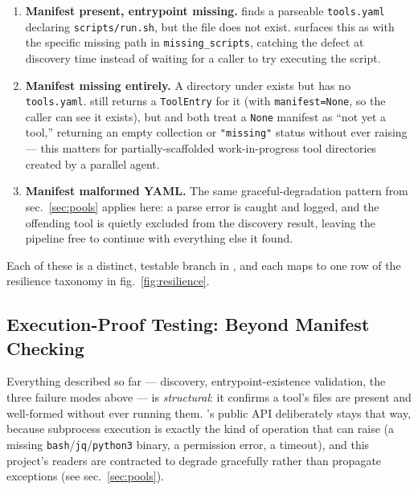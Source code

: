 \documentclass[
]{article}
\providecommand{\tightlist}{%
  \setlength{\itemsep}{0pt}\setlength{\parskip}{0pt}}
\begin{document}
\begin{enumerate}
\def\labelenumi{\arabic{enumi}.}
\tightlist
\item
  \textbf{Manifest present, entrypoint missing.}
   finds a parseable \texttt{tools.yaml}
  declaring \texttt{scripts/run.sh}, but the file does not exist.
   surfaces this as
   with the specific missing path in
  \texttt{missing\_scripts}, catching the defect at discovery time
  instead of waiting for a caller to try executing the script.
\item
  \textbf{Manifest missing entirely.} A directory under
   exists but has no \texttt{tools.yaml}.
   still returns a \texttt{ToolEntry} for it
  (with \texttt{manifest=None}, so the caller can see it exists), but
   and
   both treat a \texttt{None}
  manifest as ``not yet a tool,'' returning an empty collection or
  \texttt{"missing"} status without ever raising --- this matters for
  partially-scaffolded work-in-progress tool directories created by a
  parallel agent.
\item
  \textbf{Manifest malformed YAML.} The same graceful-degradation
  pattern from sec.~\ref{sec:pools} applies here: a parse error is
  caught and logged, and the offending tool is quietly excluded from the
  discovery result, leaving the pipeline free to continue with
  everything else it found.
\end{enumerate}

Each of these is a distinct, testable branch in
, and each maps to one row
of the resilience taxonomy in fig.~\ref{fig:resilience}.

\subsection{Execution-Proof Testing: Beyond Manifest
Checking}\label{execution-proof-testing-beyond-manifest-checking}

Everything described so far --- discovery, entrypoint-existence
validation, the three failure modes above --- is \emph{structural}: it
confirms a tool's files are present and well-formed without ever running
them.
's
public API deliberately stays that way, because subprocess execution is
exactly the kind of operation that can raise (a missing
\texttt{bash}/\texttt{jq}/\texttt{python3} binary, a permission error, a
timeout), and this project's readers are contracted to degrade
gracefully rather than propagate exceptions (see sec.~\ref{sec:pools}).
\end{document}
